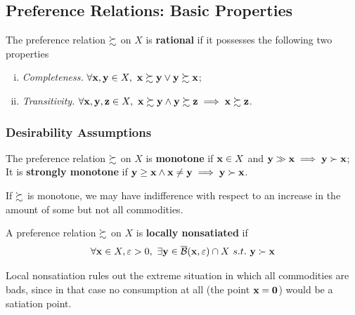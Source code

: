\documentclass{article}
\begin{document}
 		\subsection{Preference Relations: Basic Properties}
 			\begin{definition}[3.B.1]
 				The preference relation $\succsim$ on $X$ is \textbf{rational} if it possesses the following two properties
 				\begin{enumerate}[(i)]
 					\item \emph{Completeness.} $\forall \textbf{x}, \textbf{y} \in X,\ \textbf{x} \succsim \textbf{y} \lor \textbf{y} \succsim \textbf{x}$;
 					\item \emph{Transitivity.} $\forall \textbf{x}, \textbf{y}, \textbf{z} \in X,\ \textbf{x} \succsim \textbf{y} \land \textbf{y} \succsim \textbf{z} \implies \textbf{x} \succsim \textbf{z}$.
 				\end{enumerate}
 			\end{definition}
 			
 			\subsubsection{Desirability Assumptions}
 			
 			\begin{definition}[3.B.2]
 				The preference relation $\succsim$ on $X$ is \textbf{monotone} if $\textbf{x} \in X$ and $\textbf{y} \gg \textbf{x} \implies \textbf{y} \succ \textbf{x}$; It is \textbf{strongly monotone} if $\textbf{y} \geq \textbf{x} \land \textbf{x} \neq \textbf{y} \implies \textbf{y} \succ \textbf{x}$.
 			\end{definition}
 			
 			\begin{remark}
 				If $\succsim$ is monotone, we may have indifference with respect to an increase in the amount of some but not all commodities.
 			\end{remark}
 			
 			\begin{definition}[3.B.3]
 				A preference relation $\succsim$ on $X$ is \textbf{locally nonsatiated} if
 				\begin{equation}
 					\forall \textbf{x} \in X, \varepsilon > 0,\ \exists \textbf{y} \in \overline{\mathcal{{B}}}(\textbf{x}, \varepsilon) \cap X\ s.t.\ \textbf{y} \succ \textbf{x}
 				\end{equation}
 			\end{definition}
 			
 			\begin{remark}
 				Local nonsatiation rules out the extreme situation in which all commodities are bads, since in that case no consumption at all (the point $\textbf{x} = \textbf{0}$) would be a satiation point.
 			\end{remark}
 			
\end{document}
